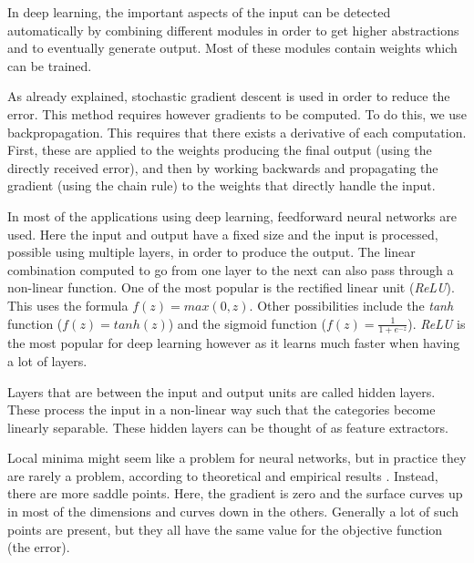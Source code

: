 \documentclass[a4paper, 11pt]{article}
\begin{document}
In deep learning, the important aspects of the input can be detected automatically by combining different modules in order to get higher abstractions and to eventually generate output.
Most of these modules contain weights which can be trained.

As already explained, stochastic gradient descent is used in order to reduce the error. This method requires however gradients to be computed. To do this, we use backpropagation. This requires that there exists a derivative of each computation. First, these are applied to the weights producing the final output (using the directly received error), and then by working backwards and propagating the gradient (using the chain rule) to the weights that directly handle the input.

In most of the applications using deep learning, feedforward neural networks are used. Here the input and output have a fixed size and the input is processed, possible using multiple layers, in order to produce the output.
The linear combination computed to go from one layer to the next can also pass through a non-linear function. One of the most popular is the rectified linear unit (\textit{ReLU}). This uses the formula $f(z) = max(0,z)$. Other possibilities include the \textit{tanh} function ($f(z) = tanh(z)$) and the sigmoid function ($f(z) = \frac{1}{1 + e^{-z}}$). \textit{ReLU} is the most popular for deep learning however as it learns much faster when having a lot of layers.

Layers that are between the input and output units are called hidden layers. These process the input in a non-linear way such that the categories become linearly separable. These hidden layers can be thought of as feature extractors.

Local minima might seem like a problem for neural networks, but in practice they are rarely a problem, according to theoretical and empirical results \citep{choromanska2015loss}.
Instead, there are more saddle points. Here, the gradient is zero and the surface curves up in most of the dimensions and curves down in the others. Generally a lot of such points are present, but they all have the same value for the objective function (the error).\\
\end{document}

